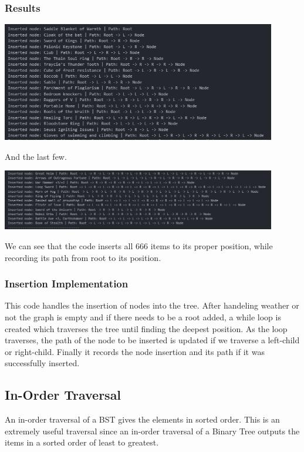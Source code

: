 \documentclass[12pt, letterpaper]{article}
\begin{document}
\subsubsection{Results}
\begin{center}
   \includegraphics[width=120mm, scale=0.5]{Images/BinTree_InsertStart.png}
\end{center}
And the last few.
\begin{center}
   \includegraphics[width=120mm, scale=0.5]{Images/BinTree_InsertEnd.png}
\end{center}
We can see that the code inserts all 666 items to its proper position, while recording its path from root to its position.
\subsubsection{Insertion Implementation}
\begin{center}
   
\end{center}
This code handles the insertion of nodes into the tree.
After handeling weather or not the graph is empty and if there needs to be a root added, a while loop is created which traverses the tree until finding the deepest position.
As the loop traverses, the path of the node to be inserted is updated if we traverse a left-child or right-child.
Finally it records the node insertion and its path if it was successfully inserted.

\subsection{In-Order Traversal} \label{Trav}
An in-order traversal of a BST gives the elements in sorted order.
This is an extremely useful traversal since an in-order traversal of a Binary Tree outputs the items in a sorted order of least to greatest.
\end{document}
